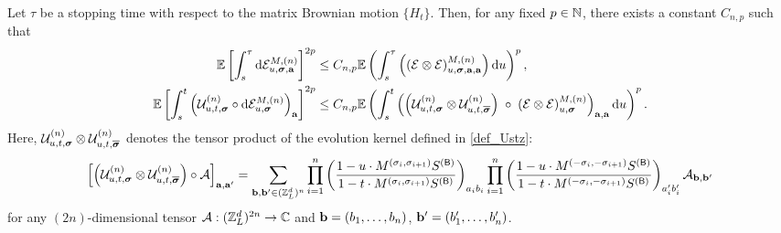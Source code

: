 \begin{lemma}\label{lem:DIfREP}
Let $\tau$ be a stopping time with respect to the matrix Brownian motion $\{H_t\}$. Then, for any fixed $p\in \mathbb{N}$, there exists a constant $C_{n,p}$ such that
\begin{align}\label{aaswtghh}
   \mathbb{E} \left [    \int_{s}^\tau \mathrm{d}  \mathcal{E}^{M,(n)}_{u, {\boldsymbol{\sigma}}, {{{\mathbf{a}}}}}  \right ]^{2p} 
   &\le C_{n,p}  
   \mathbb{E} \left(\int_{s}^\tau 
   \left( 
   \left( \mathcal{E} \otimes  \mathcal{E} \right)
  ^{M,(n)}_{u, {\boldsymbol{\sigma}}, {\mathbf{a}},{\mathbf{a}}}  
   \right)\mathrm{d} u 
   \right)^{p},\\
   \label{alu9_STime}
   \mathbb{E} \left [    \int_{s}^t\left(\mathcal{U}^{(n)}_{u, t, {\boldsymbol{\sigma}}} \circ \mathrm{d}\mathcal E^{M,(n)}_{u, {\boldsymbol{\sigma}}}\right)_{{\mathbf{a}}} \right ]^{2p} 
   &\le C_{n,p}
   \mathbb{E} \left(\int_{s}^t 
   \left(\left(
   \mathcal{U}^{(n)}_{u, t,  {\boldsymbol{\sigma}}}
   \otimes 
   \mathcal{U}^{(n)}_{u, t,  \overline{{\boldsymbol{\sigma}}}}
   \right) \;\circ  \;
   \left( \mathcal E \otimes \mathcal E\right)^{M,(n)}
   _{u, {\boldsymbol{\sigma}}  }
   \right)_{{\mathbf{a}}, {\mathbf{a}}}\mathrm{d} u 
   \right)^{p}.
  \end{align} 
Here, $\mathcal{U}^{(n)}_{u, t,  {\boldsymbol{\sigma}}} \otimes    \mathcal{U}^{(n)}_{u, t,  \overline{{\boldsymbol{\sigma}}}}$ denotes the tensor product of the evolution kernel defined in \eqref{def_Ustz}: 
  $$
  \left[\left(
   \mathcal{U}^{(n)}_{u, t,  {\boldsymbol{\sigma}}}
   \otimes 
   \mathcal{U}^{(n)}_{u, t,  \overline{{\boldsymbol{\sigma}}}}
   \right)\circ \mathcal A\right]_{{\mathbf{a}},{\mathbf{a}}'}=
   \sum_{{\mathbf{b}},{\mathbf{b}}'\in({\mathbb Z}_L^d)^{n}}  \prod_{i=1}^n \left(\frac{1 - u\cdot M^{(\sigma_i,\sigma_{i+1})} S^{({\mathsf{B}})}}{1 - t\cdot  M^{(\sigma_i,\sigma_{i+1})} S^{({\mathsf{B}})}}\right)_{a_i b_i} \prod_{i=1}^n \left(\frac{1 - u\cdot M^{(-\sigma_i,-\sigma_{i+1})} S^{({\mathsf{B}})} }{1 - t\cdot M^{(-\sigma_i,-\sigma_{i+1})} S^{({\mathsf{B}})} }\right)_{a'_i b'_i} \mathcal{A}_{{\mathbf{b}},{\mathbf{b}}'}
  $$
  for any $(2n)$-dimensional tensor ${\mathcal A}: ({\mathbb Z}_L^d)^{2n}\to \mathbb C$ and ${\mathbf{b}}=(b_1,\ldots, b_n)$, ${\mathbf{b}}'=(b_1',\ldots, b_n')$.
  
  

\end{lemma}
